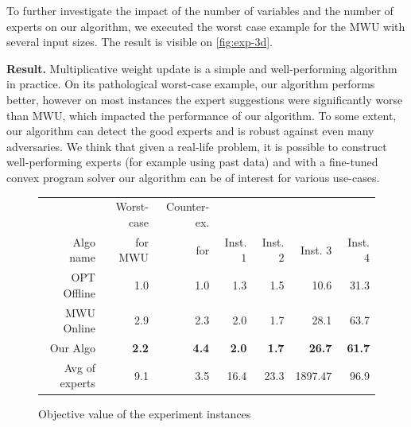 To further investigate the impact of the number of variables and the number of experts on our algorithm, we executed the worst case example for the MWU with several input sizes. The result is visible on \cref{fig:exp-3d}.

\textbf{Result.} Multiplicative weight update is a simple and well-performing algorithm in practice. On its pathological worst-case example, our algorithm performs better, however on most instances the expert suggestions were significantly worse than MWU, which impacted the performance of our algorithm. To some extent, our algorithm can detect the good experts and is robust against even many adversaries. We think that given a real-life problem, it is possible to construct well-performing experts (for example using past data) and with a fine-tuned convex program solver our algorithm can be of interest for various use-cases.

\begin{figure}[!ht]
\centering
\begin{tabular}{r|r|r|r|r|r|r}
          & Worst-case & Counter-ex. & & & & \\
Algo name & for MWU  & for \cite{AnandGe22:Online-Algorithms} & Inst. $1$ & Inst. $2$ & Inst. $3$ & Inst. $4$\\
\hline
OPT Offline            & 1.0 & 1.0 & 1.3 & 1.5 & 10.6 & 31.3 \\
MWU Online             & 2.9 & 2.3 & 2.0 & 1.7 & 28.1 & 63.7 \\
\hline
Our Algo           & {\bf 2.2} & {\bf 4.4} & {\bf 2.0} & {\bf 1.7} & {\bf 26.7}  & {\bf 61.7} \\
\hline
Avg of experts      & 9.1 & 3.5 & 16.4 & 23.3 & 1897.47 & 96.9 \\
\end{tabular}
\caption{Objective value of the experiment instances}
\label{fig:exp-objective}
\end{figure}

